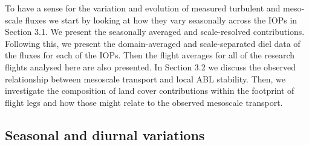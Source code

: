 \documentclass[draft]{agujournal2019}
\begin{document}
To have a sense for the variation and evolution of measured turbulent and meso- scale fluxes we start by looking at how they vary seasonally across the IOPs in Section 3.1. We present the seasonally averaged and scale-resolved contributions. Following this, we present the domain-averaged and scale-separated diel data of the fluxes for each of the IOPs. Then the flight averages for all of the research flights analysed here are also presented. In Section 3.2 we discuss the observed relationship between mesoscale transport and local ABL stability. Then, we investigate the composition of land cover contributions within the footprint of flight legs and how those might relate to the observed mesoscale transport. 

\subsection{Seasonal and diurnal variations}
\end{document}
